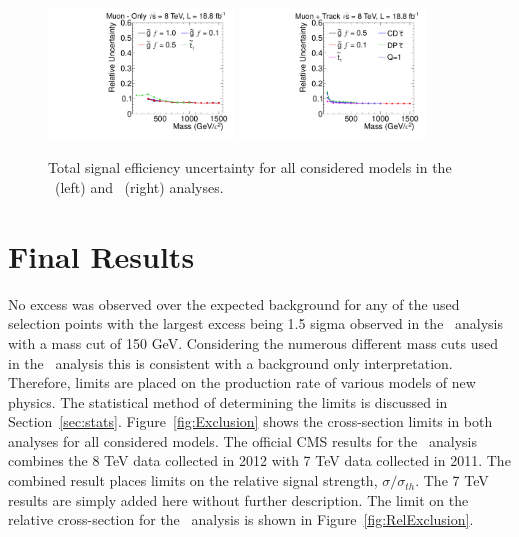 \begin{figure}
\centering
  \includegraphics[clip=true, trim=0.0cm 0cm 2.8cm 0cm, width=0.44\textwidth]{figures/muonly/MOUncertainty}
  \includegraphics[clip=true, trim=0.0cm 0cm 2.8cm 0cm, width=0.44\textwidth]{figures/tkmu/MuUncertainty}
\caption{Total signal efficiency uncertainty for all considered models in the \muononly\ (left) and \tktof\ (right) analyses.
    \label{fig:TotalUnc}}
\end{figure}

\section{Final Results}
No excess was observed over the expected background for any of the used selection points with the largest excess being 1.5 sigma observed in the \tktof\ analysis with
a mass cut of 150 GeV. Considering the numerous different mass cuts used in the \tktof\ analysis this is consistent with a background only interpretation.
Therefore, limits are placed on the production rate of various models of new physics. The statistical method of determining the limits is discussed in
Section~\ref{sec:stats}. Figure~\ref{fig:Exclusion} shows the cross-section limits in both analyses for all considered models.
The official CMS results for the \tktof\ analysis combines the 8 TeV data collected in 2012 with 7 TeV data collected in 2011. The combined result places limits on
the relative signal strength, $\sigma/\sigma_{th}$. The 7 TeV results are simply added here without further description. The limit on the relative cross-section
for the \tktof\ analysis is shown in Figure~\ref{fig:RelExclusion}.

